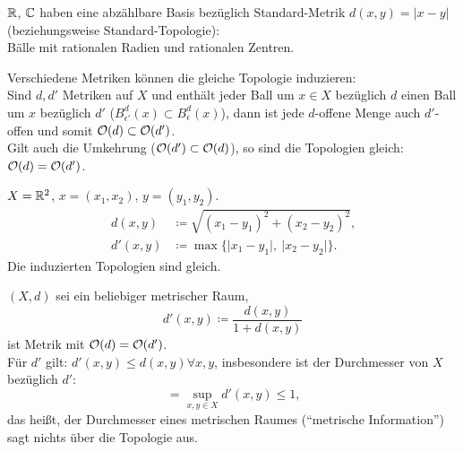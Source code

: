 \begin{example}
  \( \mathbb{R} \), \( \mathbb{C} \) haben eine abzählbare Basis bezüglich Standard-Metrik \( d(x,y) = \vert x - y \vert \) (beziehungsweise Standard-Topologie): \\
  Bälle mit rationalen Radien und rationalen Zentren.
\end{example}

\begin{remark}
  Verschiedene Metriken können die gleiche Topologie induzieren: \\
  Sind \( d, d' \) Metriken auf \( X \) und enthält jeder Ball um \( x \in X \) bezüglich \( d \) einen Ball um \( x \) bezüglich \( d' \) (\( B_{\epsilon'}^d(x) \subset B_\epsilon^d(x) \)), dann ist jede \( d \)-offene Menge auch \( d' \)-offen und somit \( \mathcal{O}(d) \subset \mathcal{O}(d') \). \\
  Gilt auch die Umkehrung (\( \mathcal{O}(d') \subset \mathcal{O}(d) \)), so sind die Topologien gleich: \( \mathcal{O}(d) = \mathcal{O}(d') \).
\end{remark}

\begin{example}
  \( X = \mathbb{R}^2 \), \( x = (x_1, x_2) \), \( y = (y_1, y_2) \).
  \begin{align*}
    d(x,y) &\coloneqq \sqrt{{(x_1-y_1)}^2+{(x_2-y_2)}^2}\text{,} \\
    d'(x,y) &\coloneqq \max \{ \vert x_1-y_1\vert, \ \vert x_2-y_2 \vert \}\text{.}
  \end{align*}
  Die induzierten Topologien sind gleich.
\end{example}

\begin{example}
  \( (X, d) \) sei ein beliebiger metrischer Raum,
  \begin{equation*}
    d'(x,y) \coloneqq \frac{d(x,y)}{1 + d(x,y)}
  \end{equation*}
  ist Metrik mit \( \mathcal{O}(d) = \mathcal{O}(d') \). \\
	Für \( d' \) gilt: \( d'(x,y) \leq d(x,y) \forall x,y \), insbesondere ist der Durchmesser von \( X \) bezüglich \( d' \):
  \begin{equation*}
    = \sup_{x,y \in X}d'(x,y) \leq 1\text{,}
  \end{equation*}
  das heißt, der Durchmesser eines metrischen Raumes (``metrische Information'') sagt nichts über die Topologie aus.
\end{example}

